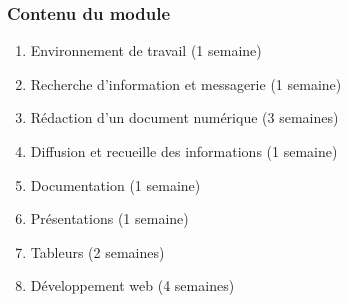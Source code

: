 \documentclass{beamer}
\begin{document}
\begin{frame}
\frametitle{Contenu du module}

\begin{enumerate}
	\item Environnement de travail (1 semaine)
	\item Recherche d'information et messagerie (1 semaine)
	\item Rédaction d'un document numérique (3 semaines)
	\item Diffusion et recueille des informations (1 semaine)
	\item Documentation (1 semaine)
	\item Présentations (1 semaine)
	\item Tableurs (2 semaines) 
	\item Développement web (4 semaines)
\end{enumerate}

\end{frame}

%
% 
\end{document}
